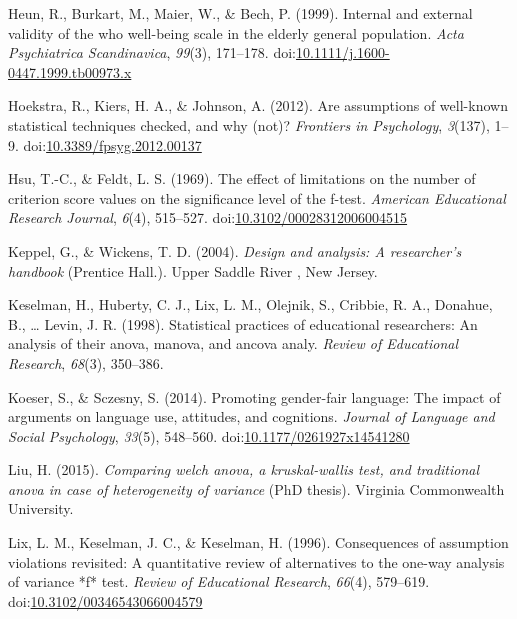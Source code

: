\documentclass[man,floatsintext]{apa6}
\begin{document}
\leavevmode\hypertarget{ref-Heun_et_al_1999}{}%
Heun, R., Burkart, M., Maier, W., \& Bech, P. (1999). Internal and external validity of the who well-being scale in the elderly general population. \emph{Acta Psychiatrica Scandinavica}, \emph{99}(3), 171--178. doi:\href{https://doi.org/10.1111/j.1600-0447.1999.tb00973.x\%20}{10.1111/j.1600-0447.1999.tb00973.x }

\leavevmode\hypertarget{ref-Hoekstra_et_al_2012}{}%
Hoekstra, R., Kiers, H. A., \& Johnson, A. (2012). Are assumptions of well-known statistical techniques checked, and why (not)? \emph{Frontiers in Psychology}, \emph{3}(137), 1--9. doi:\href{https://doi.org/10.3389/fpsyg.2012.00137}{10.3389/fpsyg.2012.00137}

\leavevmode\hypertarget{ref-Hsu_and_Feldt_1969}{}%
Hsu, T.-C., \& Feldt, L. S. (1969). The effect of limitations on the number of criterion score values on the significance level of the f-test. \emph{American Educational Research Journal}, \emph{6}(4), 515--527. doi:\href{https://doi.org/10.3102/00028312006004515}{10.3102/00028312006004515}

\leavevmode\hypertarget{ref-Keppel_and_Wickens_2004}{}%
Keppel, G., \& Wickens, T. D. (2004). \emph{Design and analysis: A researcher's handbook} (Prentice Hall.). Upper Saddle River , New Jersey.

\leavevmode\hypertarget{ref-Keselman_et_al_1998}{}%
Keselman, H., Huberty, C. J., Lix, L. M., Olejnik, S., Cribbie, R. A., Donahue, B., \ldots{} Levin, J. R. (1998). Statistical practices of educational researchers: An analysis of their anova, manova, and ancova analy. \emph{Review of Educational Research}, \emph{68}(3), 350--386.

\leavevmode\hypertarget{ref-Koeser_and_Sczesny_2014}{}%
Koeser, S., \& Sczesny, S. (2014). Promoting gender-fair language: The impact of arguments on language use, attitudes, and cognitions. \emph{Journal of Language and Social Psychology}, \emph{33}(5), 548--560. doi:\href{https://doi.org/10.1177/0261927x14541280}{10.1177/0261927x14541280}

\leavevmode\hypertarget{ref-Liu_2015}{}%
Liu, H. (2015). \emph{Comparing welch anova, a kruskal-wallis test, and traditional anova in case of heterogeneity of variance} (PhD thesis). Virginia Commonwealth University.

\leavevmode\hypertarget{ref-Lix_Keselman_Keselman_1996}{}%
Lix, L. M., Keselman, J. C., \& Keselman, H. (1996). Consequences of assumption violations revisited: A quantitative review of alternatives to the one-way analysis of variance *f* test. \emph{Review of Educational Research}, \emph{66}(4), 579--619. doi:\href{https://doi.org/10.3102/00346543066004579}{10.3102/00346543066004579}
\end{document}
